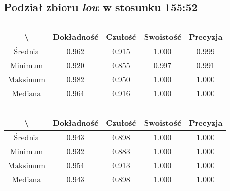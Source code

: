 \subsection{Podział zbioru \textit{low} w stosunku 155:52}


\begin{table}[H]
	\centering
	\caption{}
	\vspace{6pt}
	{\footnotesize
		\begin{tabular}{|c|c|c|c|c|}
      \hline \textbackslash & Dokładność & Czułość & Swoistość & Precyzja \\
      \hline Średnia & 0.962 & 0.915 & 1.000 & 0.999 \\
      \hline Minimum & 0.920 & 0.855 & 0.997 & 0.991 \\
      \hline Maksimum & 0.982 & 0.950 & 1.000 & 1.000 \\
      \hline Mediana & 0.964 & 0.916 & 1.000 & 1.000 \\
      \hline
    \end{tabular}
    \label{Tab:lowsplitc_val}
	}
	\vspace{0pt}
\end{table}

\begin{table}[H]
	\centering
	\caption{}
	\vspace{6pt}
	{\footnotesize
		\begin{tabular}{|c|c|c|c|c|}
      \hline \textbackslash & Dokładność & Czułość & Swoistość & Precyzja \\
      \hline Średnia & 0.943 & 0.898 & 1.000 & 1.000 \\
      \hline Minimum & 0.932 & 0.883 & 1.000 & 1.000 \\
      \hline Maksimum & 0.954 & 0.913 & 1.000 & 1.000 \\
      \hline Mediana & 0.943 & 0.898 & 1.000 & 1.000 \\
      \hline
    \end{tabular}
    \label{Tab:lowsplitc_test}
	}
	\vspace{0pt}
\end{table}

